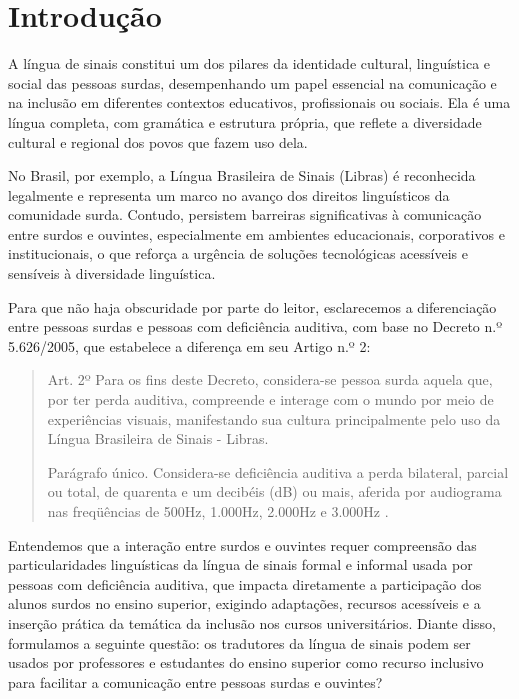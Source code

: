 \documentclass[portuguese]{textolivre}
\begin{document}
\section{Introdução}
A língua de sinais constitui um dos pilares da identidade cultural, linguística e social das pessoas surdas, desempenhando um papel essencial na comunicação e na inclusão em diferentes contextos educativos, profissionais ou sociais. Ela é uma língua completa, com gramática e estrutura própria, que reflete a diversidade cultural e regional dos povos que fazem uso dela.

No Brasil, por exemplo, a Língua Brasileira de Sinais (Libras) é reconhecida legalmente e representa um marco no avanço dos direitos linguísticos da comunidade surda. Contudo, persistem barreiras significativas à comunicação entre surdos e ouvintes, especialmente em ambientes educacionais, corporativos e institucionais, o que reforça a urgência de soluções tecnológicas acessíveis e sensíveis à diversidade linguística.

Para que não haja obscuridade por parte do leitor, esclarecemos a diferenciação entre pessoas surdas e pessoas com deficiência auditiva, com base no Decreto n.º 5.626/2005, que estabelece a diferença em seu Artigo n.º 2: 

\begin{quote}
    Art. 2º Para os fins deste Decreto, considera-se pessoa surda aquela que, por ter perda auditiva, compreende e interage com o mundo por meio de experiências visuais, manifestando sua cultura principalmente pelo uso da Língua Brasileira de Sinais - Libras.
    
    Parágrafo único. Considera-se deficiência auditiva a perda bilateral, parcial ou total, de quarenta e um decibéis (dB) ou mais, aferida por audiograma nas freqüências de 500Hz, 1.000Hz, 2.000Hz e 3.000Hz \cite{Brasil2005Decreto5626}.
\end{quote}


Entendemos que a interação entre surdos e ouvintes requer compreensão das particularidades linguísticas da língua de sinais formal e informal usada por pessoas com deficiência auditiva, que impacta diretamente a participação dos alunos surdos no ensino superior, exigindo adaptações, recursos acessíveis e a inserção prática da temática da inclusão nos cursos universitários. Diante disso, formulamos a seguinte questão: os tradutores da língua de sinais podem ser usados por professores e estudantes do ensino superior como recurso inclusivo para facilitar a comunicação entre pessoas surdas e ouvintes?
\end{document}

